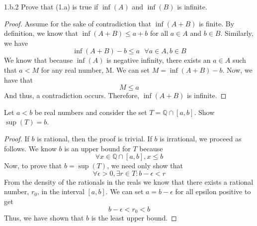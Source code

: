 \documentclass[boxes]{rutgers_hw}
\begin{document}
\begin{exern}{1.b.2} 
  Prove that (1.a) is true if $\inf(A)$ and $\inf(B)$ is infinite.
\end{exern}
\begin{proof}
  Assume for the sake of contradiction that $\inf(A+B)$ is finite. 
  By definition, we know that $\inf(A+B) \le a + b$ for all $a \in A$ and $b \in B$.
  Similarly, we have
  \[ \inf(A+B) - b \le a \ \ \ \forall a \in A, b \in B \]
  We know that because $\inf(A)$ is negative infinity, there exists an $a \in A$ such that $a < M$ for any real number, M.
  We can set $M = \inf(A+B) - b$.
  Now, we have that
  \[ M \le a \]
  And thus, a contradiction occurs.
  Therefore, $\inf(A+B)$ is infinite.
\end{proof}

\pagebreak

\begin{exern}{2}
  Let $a < b$ be real numbers and consider the set $T = \mathbb{Q}\cap[a,b]$. Show $\sup(T) = b$.
\end{exern}
\begin{proof}
  If $b$ is rational, then the proof is trivial. If $b$ is irrational, we proceed as follows.
  We know $b$ is an upper bound for $T$ because
  \[ \forall x \in \mathbb{Q}\cap[a,b], x \le b\]
  Now, to prove that $b = \sup(T)$, we need only show that
  \[ \forall \epsilon > 0, \exists r \in T:b - \epsilon < r\]
  From the density of the rationals in the reals we know that there exists a rational number, $r_0$, in the interval $[a,b]$.
  We can set $a = b - \epsilon$ for all epsilon positive to get
  \[ b - \epsilon < r_0 < b \]
  Thus, we have shown that $b$ is the least upper bound.
\end{proof}
\end{document}
